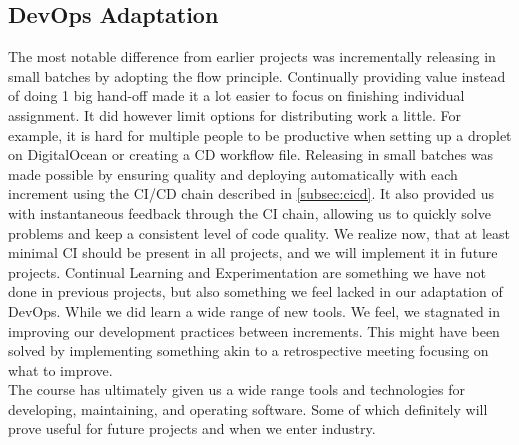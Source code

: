 \subsection{DevOps Adaptation}
The most notable difference from earlier projects was incrementally releasing in small batches by adopting the flow principle. Continually providing value instead of doing 1 big hand-off made it a lot easier to focus on finishing individual assignment. It did however limit options for distributing work a little. For example, it is hard for multiple people to be productive when setting up a droplet on DigitalOcean or creating a CD workflow file. 
Releasing in small batches was made possible by ensuring quality and deploying automatically with each increment using the CI/CD chain described in \ref{subsec:cicd}. It also provided us with instantaneous feedback through the CI chain, allowing us to quickly solve problems and keep a consistent level of code quality. We realize now, that at least minimal CI should be present in all projects, and we will implement it in future projects.
Continual Learning and Experimentation are something we have not done in previous projects, but also something we feel lacked in our adaptation of DevOps. While we did learn a wide range of new tools. We feel, we stagnated in improving our development practices between increments. This might have been solved by implementing something akin to a retrospective meeting focusing on what to improve.\\
The course has ultimately given us a wide range tools and technologies for developing, maintaining, and operating software. Some of which definitely will prove useful for future projects and when we enter industry.